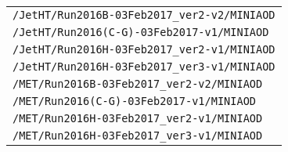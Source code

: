 \begin{table}[ht!]
\begin{center}
\begin{tabular}{ l}
        \texttt{/JetHT/Run2016B-03Feb2017\_ver2-v2/MINIAOD}   \\
        \texttt{/JetHT/Run2016(C-G)-03Feb2017-v1/MINIAOD}   \\
        \texttt{/JetHT/Run2016H-03Feb2017\_ver2-v1/MINIAOD}    \\
        \texttt{/JetHT/Run2016H-03Feb2017\_ver3-v1/MINIAOD}   \\     
        \texttt{/MET/Run2016B-03Feb2017\_ver2-v2/MINIAOD}   \\
        \texttt{/MET/Run2016(C-G)-03Feb2017-v1/MINIAOD}   \\
        \texttt{/MET/Run2016H-03Feb2017\_ver2-v1/MINIAOD}    \\
        \texttt{/MET/Run2016H-03Feb2017\_ver3-v1/MINIAOD}   \\     
\hline\hline
\end{tabular}
\end{center}
\end{table}                                                                                  
